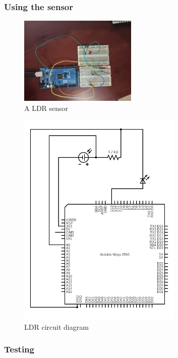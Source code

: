 \subsubsection{Using the sensor}

\begin{figure}[H]
    \centering
    \includegraphics[width=0.5\textwidth]{fig/ldr-circuit.jpg}
    \caption{A LDR sensor}
    \label{fig:ldr}
\end{figure}




\begin{figure}[H]
    \centering
    \includegraphics[width=0.7\textwidth]{fig/ldr-scheme-circuit.png}
    \caption{LDR circuit diagram}
    \label{fig:ldr}
\end{figure}


\subsubsection{Testing}

